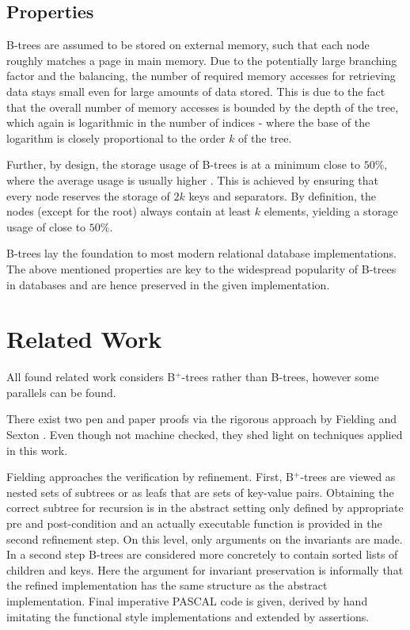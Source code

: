 \subsection{Properties}

B-trees are assumed to be stored on external memory,
such that each node roughly matches a page in main memory.
Due to the potentially large branching factor and the balancing,
the number of required memory accesses for retrieving data stays small even for
large amounts of data stored.
This is due to the fact that the overall number of memory accesses is bounded by the depth
of the tree, which again is logarithmic in the number of indices -
where the base of the logarithm is closely proportional to the order $k$ of the tree.

Further, by design, the storage usage of B-trees is at a minimum close to $50\%$,
where the average usage is usually higher \parencite{DBLP:journals/acta/BayerM72}.
This is achieved by ensuring that every node reserves the storage of $2k$ keys and separators.
By definition, the nodes (except for the root) always contain
at least $k$ elements, yielding a storage usage of close to $50\%$.

B-trees lay the foundation to most modern relational database implementations.
The above mentioned properties are key to the widespread popularity of B-trees
in databases and are hence preserved in the given implementation.

\section{Related Work}

All found related work considers B$^+$-trees
rather than B-trees, however some parallels can be found.

There exist two pen and paper proofs via the rigorous approach
by Fielding \parencite{Fielding80} and Sexton \parencite{DBLP:journals/entcs/SextonT08}.
Even though not machine checked, they shed light on techniques applied in this work.

Fielding approaches the verification by refinement.
First, B$^+$-trees are viewed as nested sets of subtrees
or as leafs that are sets of key-value pairs.
Obtaining the correct subtree for recursion is in the abstract setting
only defined by appropriate pre and post-condition
and an actually executable function is provided in the second refinement step.
On this level, only arguments on the invariants are made.
In a second step B-trees are considered more concretely to contain
sorted lists of children and keys.
Here the argument for invariant preservation is informally
that the refined implementation
has the same structure as the abstract implementation.
Final imperative PASCAL code is given, derived by hand
imitating the functional style implementations and extended by assertions.


